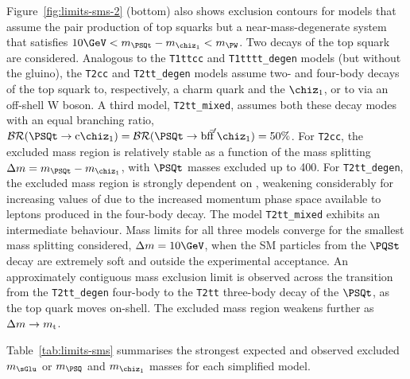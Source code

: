Figure~\ref{fig:limits-sms-2} (bottom) also shows exclusion contours
for models that assume the pair production of top squarks but a
near-mass-degenerate system that satisfies $10\GeV < m_{\PSQt} -
m_{\chiz_1} < m_\PW$. Two decays of the top squark are
considered. Analogous to the \texttt{T1ttcc} and
\texttt{T1tttt\_degen} models (but without the gluino), the
\texttt{T2cc} and \texttt{T2tt\_degen} models assume two- and
four-body decays of the top squark to, respectively, a charm quark and
the $\chiz_1$, or to via an off-shell W boson. A third model,
\texttt{T2tt\_mixed}, assumes both these decay modes with an equal
branching ratio, $\mathcal{BR}(\PSQt \ra \text{c}\chiz_1) =
\mathcal{BR}(\PSQt \ra \text{bf}\bar{\text{f}}'\chiz_1) = 50\%$. For
\texttt{T2cc}, the excluded mass region is relatively stable as a
function of the mass splitting $\dm = m_{\PSQt} - m_{\chiz_1}$, with
$\PSQt$ masses excluded up to 400\GeV. For \texttt{T2tt\_degen}, the
excluded mass region is strongly dependent on \dm, weakening
considerably for increasing values of \dm due to the increased
momentum phase space available to leptons produced in the four-body
decay. The model \texttt{T2tt\_mixed} exhibits an intermediate
behaviour. Mass limits for all three models converge for the smallest
mass splitting considered, $\dm = 10\GeV$, when the SM particles from
the $\PQSt$ decay are extremely soft and outside the experimental
acceptance. An approximately contiguous mass exclusion limit is
observed across the transition from the \texttt{T2tt\_degen} four-body
to the \texttt{T2tt} three-body decay of the $\PSQt$, as the top quark
moves on-shell. The excluded mass region weakens further as $\Delta m \rightarrow
m_\text{t}$.

Table~\ref{tab:limits-sms} summarises the strongest expected and
observed excluded $m_{\sGlu}$ or $m_{\PSQ}$ and $m_{\chiz_1}$ masses
for each simplified model.

